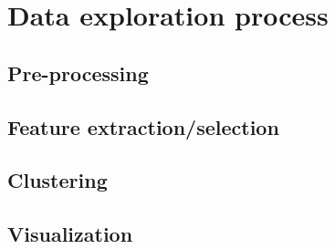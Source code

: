 \section{Data exploration process}

\subsection{Pre-processing}
\subsection{Feature extraction/selection}
\subsection{Clustering}
\subsection{Visualization}
